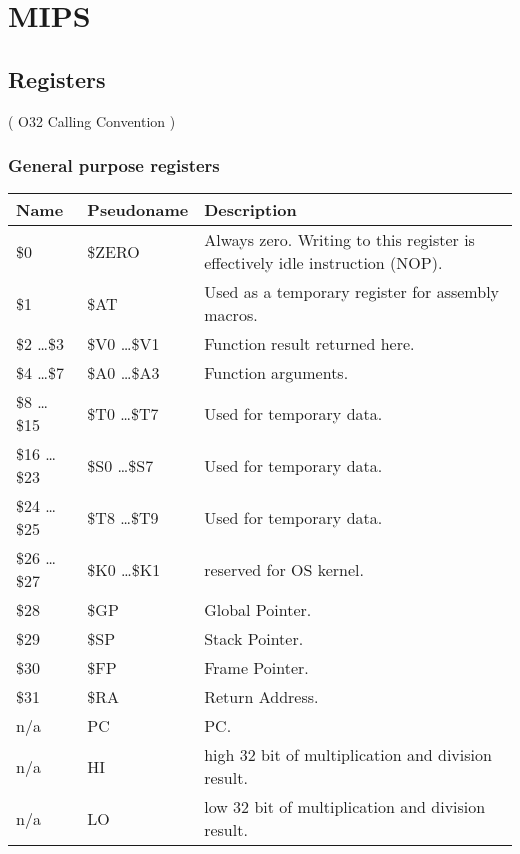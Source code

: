 \ifx\RUSSIAN\undefined
\chapter{MIPS}

\section{Registers}
\label{MIPS_registers_ref}

( O32 Calling Convention )

\subsection{General purpose registers}

\begin{center}
\begin{tabular}{ | l | l | l | }
\hline
\cellcolor{blue!25} Name & \cellcolor{blue!25} Pseudoname & \cellcolor{blue!25} Description \\
\hline
\$0             & \$ZERO          & Always zero. Writing to this register is effectively idle instruction (\ac{NOP}). \\
\hline
\$1             & \$AT            & Used as a temporary register for assembly macros. \\
\hline
\$2 \dots \$3   & \$V0 \dots \$V1 & Function result returned here. \\
\hline
\$4 \dots \$7   & \$A0 \dots \$A3 & Function arguments. \\
\hline
\$8 \dots \$15  & \$T0 \dots \$T7 & Used for temporary data. \\
\hline
\$16 \dots \$23 & \$S0 \dots \$S7 & Used for temporary data\AsteriskOne{}. \\
\hline
\$24 \dots \$25 & \$T8 \dots \$T9 & Used for temporary data. \\
\hline
\$26 \dots \$27 & \$K0 \dots \$K1 & reserved for OS kernel. \\
\hline
\$28            & \$GP            & Global Pointer\AsteriskTwo{}. \\
\hline
\$29            & \$SP            & Stack Pointer\AsteriskOne{}. \\
\hline
\$30            & \$FP            & Frame Pointer\AsteriskOne{}. \\
\hline
\$31            & \$RA            & Return Address. \\
\hline
n/a             & PC              & \ac{PC}. \\
\hline
n/a             & HI              & high 32 bit of multiplication and division result\AsteriskThree{}. \\
\hline
n/a             & LO              & low 32 bit of multiplication and division result\AsteriskThree{}. \\
\hline
\end{tabular}
\end{center}

